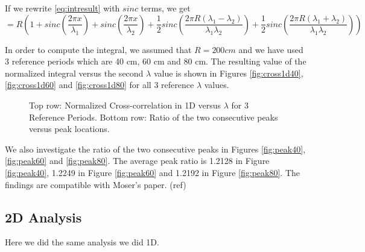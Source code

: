 \documentclass[11pt, letterpaper, onecolumn]{article}
\begin{document}
If we rewrite \eqref{eq:intresult} with $ sinc $ terms, we get
\begin{equation}
= R( 1 + sinc(\frac{2 \pi x }{\lambda_1}) + sinc(\frac{2 \pi x }{\lambda_2}) + \frac{1}{2} sinc(\frac{2 \pi R (\lambda_1 - \lambda_2)}{\lambda_1 \lambda_2}) + \frac{1}{2} sinc(\frac{2 \pi R (\lambda_1 + \lambda_2)}{\lambda_1 \lambda_2}))
\label{eq:intresult2}
\end{equation}

In order to compute the integral, we assumed that $ R = 200 cm $ and we have used 3 reference periods which are 40 cm, 60 cm and 80 cm. The resulting value of the normalized integral versus the second $ \lambda $ value is shown in Figures \ref{fig:cross1d40}, \ref{fig:cross1d60} and \ref{fig:cross1d80} for all 3 reference $ \lambda $ values.

\begin{figure}[H]
\centering
{}
\caption{Top row: Normalized Cross-correlation in 1D versus $ \lambda $ for 3 Reference Periods. Bottom row: Ratio of the two consecutive peaks versus peak locations. }
\label{fig:1d}
\end{figure}

We also investigate the ratio of the two consecutive peaks in Figures \ref{fig:peak40}, \ref{fig:peak60} and \ref{fig:peak80}. The average peak ratio is 1.2128 in Figure \ref{fig:peak40}, 1.2249 in Figure \ref{fig:peak60} and 1.2192 in Figure \ref{fig:peak80}. The findings are compatible with Moser's paper. (ref)

\subsection{2D Analysis}

Here we did the same analysis we did 1D.
\end{document}
